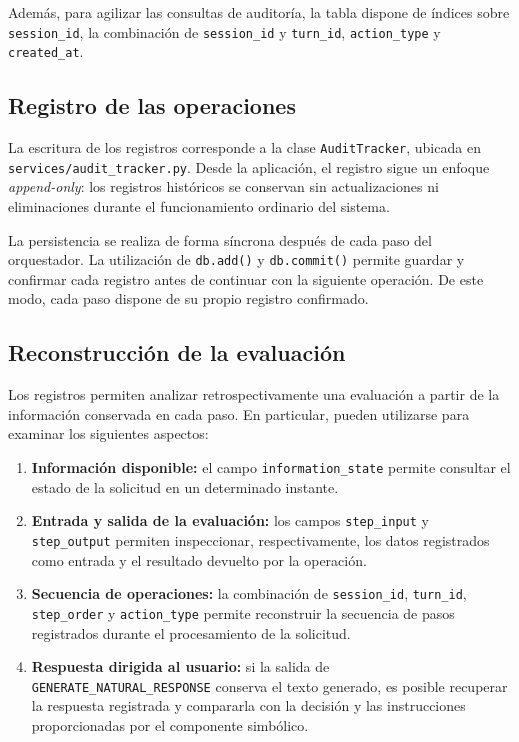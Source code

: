 \documentclass[12pt,a4paper]{report}
\begin{document}
Además, para agilizar las consultas de auditoría, la tabla dispone de índices sobre \texttt{session\_id}, la combinación de \texttt{session\_id} y \texttt{turn\_id}, \texttt{action\_type} y \texttt{created\_at}.

\subsection{Registro de las operaciones}

La escritura de los registros corresponde a la clase \texttt{AuditTracker}, ubicada en \texttt{services/audit\_tracker.py}. Desde la aplicación, el registro sigue un enfoque \textit{append-only}: los registros históricos se conservan sin actualizaciones ni eliminaciones durante el funcionamiento ordinario del sistema.

La persistencia se realiza de forma síncrona después de cada paso del orquestador. La utilización de \texttt{db.add()} y \texttt{db.commit()} permite guardar y confirmar cada registro antes de continuar con la siguiente operación. De este modo, cada paso dispone de su propio registro confirmado.

\subsection{Reconstrucción de la evaluación}

Los registros permiten analizar retrospectivamente una evaluación a partir de la información conservada en cada paso. En particular, pueden utilizarse para examinar los siguientes aspectos:

\begin{enumerate}
    \item \textbf{Información disponible:} el campo \texttt{information\_state} permite consultar el estado de la solicitud en un determinado instante.
    \item \textbf{Entrada y salida de la evaluación:} los campos \texttt{step\_input} y \texttt{step\_output} permiten inspeccionar, respectivamente, los datos registrados como entrada y el resultado devuelto por la operación.
    \item \textbf{Secuencia de operaciones:} la combinación de \texttt{session\_id}, \texttt{turn\_id}, \texttt{step\_order} y \texttt{action\_type} permite reconstruir la secuencia de pasos registrados durante el procesamiento de la solicitud.
    \item \textbf{Respuesta dirigida al usuario:} si la salida de \texttt{GENERATE\_NATURAL\_RESPONSE} conserva el texto generado, es posible recuperar la respuesta registrada y compararla con la decisión y las instrucciones proporcionadas por el componente simbólico.
\end{enumerate}
\end{document}
